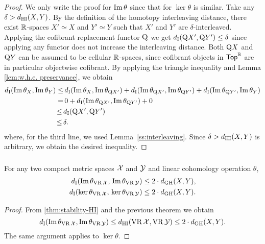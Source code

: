 \begin{proof}
	We only write the proof for $\operatorname{Im}\theta$ since that for $\ker\theta$ is similar.
	Take any $\delta > d_{\mathrm{HI}}(X,Y)$.
	By the definition of the homotopy interleaving distance, there exist $\mathbb{R}$-spaces $X' \simeq X$ and $Y' \simeq Y$ such that $X'$ and $Y'$ are $\delta$-interleaved.
	Applying the cofibrant replacement functor $\mathrm{Q}$ we get $d_{\mathrm{I}}(\mathrm{Q} X', \mathrm{Q} Y') \leq \delta$ since applying any functor does not increase the interleaving distance.
	Both $\mathrm{Q} X$ and $\mathrm{Q} Y$ can be assumed to be cellular $\mathbb{R}$-spaces, since cofibrant objects in $\mathsf{Top}^{\mathbb{R}}$ are in particular objectwise cofibrant.
	By applying the triangle inequality and Lemma \ref{lem:w.h.e. preservance}, we obtain
	\begin{align*}
		d_{\mathrm{I}}(\operatorname{Im}\theta_{X}, \operatorname{Im}\theta_{Y}) \leq& \,
		d_{\mathrm{I}}(\operatorname{Im}\theta_{X}, \operatorname{Im}\theta_{\mathrm{Q} X'}) + d_{\mathrm{I}}(\operatorname{Im}\theta_{\mathrm{Q} X'}, \operatorname{Im}\theta_{\mathrm{Q} Y'}) + d_{\mathrm{I}}(\operatorname{Im}\theta_{\mathrm{Q} Y'}, \operatorname{Im}\theta_{Y}) \\ =& \, 
		0 + d_{\mathrm{I}}(\operatorname{Im}\theta_{\mathrm{Q} X'}, \operatorname{Im}\theta_{\mathrm{Q} Y'}) + 0 \\ \leq \,&
		d_{\mathrm{I}}(\mathrm{Q} X', \mathrm{Q} Y') \\ \leq \,&
		\delta.
	\end{align*}
	where, for the third line, we used Lemma~\ref{ss:interleaving}.
 	Since $\delta > d_{\mathrm{HI}}(X,Y)$ is arbitrary, we obtain the desired inequality.
\end{proof}

\subsubsection{}\label{cor:theta stability VR}

\corollary For any two compact metric spaces $\mathcal{X}$ and $\mathcal{Y}$ and linear cohomology operation $\theta$,
\begin{align*}
	d_{\mathrm{I}}(\operatorname{Im}\theta_{\operatorname{VR}\mathcal{X}},\, \operatorname{Im}\theta_{\operatorname{VR}\mathcal{Y}}) \leq 2 \cdot d_{\mathrm{GH}}(X,Y), \\
	d_{\mathrm{I}}(\ker\theta_{\operatorname{VR}\mathcal{X}},\, \ker\theta_{\operatorname{VR}\mathcal{Y}}) \leq 2 \cdot d_{\mathrm{GH}}(X,Y).
\end{align*}

\begin{proof}
        From \cref{thm:stability-HI} and the previous theorem we obtain
        \[
        d_{\mathrm{I}}(\operatorname{Im}\theta_{\operatorname{VR}\mathcal{X}}, \operatorname{Im}\theta_{\operatorname{VR}\mathcal{Y}}) \leq
        d_{\mathrm{HI}}(\operatorname{VR}\mathcal{X}, \operatorname{VR}\mathcal{Y}) \leq 2 \cdot d_{\mathrm{GH}}(X,Y).
        \]
        The same argument applies to $\ker\theta$.
\end{proof}